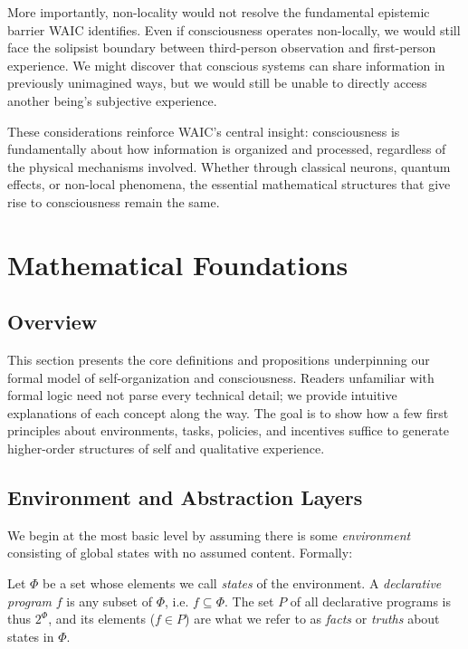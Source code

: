 \documentclass[12pt]{article}
\begin{document}
More importantly, non-locality would not resolve the fundamental epistemic barrier WAIC identifies. Even if consciousness operates non-locally, we would still face the solipsist boundary between third-person observation and first-person experience. We might discover that conscious systems can share information in previously unimagined ways, but we would still be unable to directly access another being's subjective experience.

These considerations reinforce WAIC's central insight: consciousness is fundamentally about how information is organized and processed, regardless of the physical mechanisms involved. Whether through classical neurons, quantum effects, or non-local phenomena, the essential mathematical structures that give rise to consciousness remain the same.

\section{Mathematical Foundations}

\subsection{Overview}

This section presents the core definitions and propositions underpinning our formal model of self-organization and consciousness. Readers unfamiliar with formal logic need not parse every technical detail; we provide intuitive explanations of each concept along the way. The goal is to show how a few first principles about environments, tasks, policies, and incentives suffice to generate higher-order structures of self and qualitative experience.

\subsection{Environment and Abstraction Layers}

We begin at the most basic level by assuming there is some \textit{environment} consisting of global states with no assumed content. Formally:

\begin{definition}[Environment]
Let $\Phi$ be a set whose elements we call \textit{states} of the environment. 
A \textit{declarative program} $f$ is any subset of $\Phi$, i.e. $f \subseteq \Phi$. 
The set $P$ of all declarative programs is thus $2^\Phi$, and its elements ($f \in P$) are what we refer to as \textit{facts} or \textit{truths} about states in $\Phi$.
\end{definition}
\end{document}
